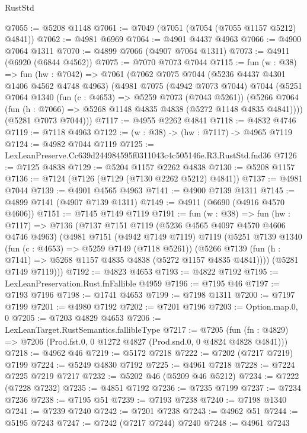 \begin{lexlean}{RustStd}
\begin{coremodule}
@7055 := @5208 @1148
@7061 := @7049 (@7051 (@7054 (@7055 @1157 @5212) @4841))
@7062 := @4981 @6969
@7064 := @4901 @4437 @4963
@7066 := @4900 @7064 @1311
@7070 := @4899 @7066 (@4907 @7064 @1311)
@7073 := @4911 (@6920 (@6844 @4562))
@7075 := @7070 @7073 @7044
@7115 := fun (w : @38) =>
  fun (hw : @7042) =>
  @7061
    (@7062
      @7075
      @7044
      (@5236 @4437 @4301 @1406 @4562 @4748 @4963)
      (@4981
        @7075
        (@4942 @7073 @7044)
        @7044
        (@5251
          @7064
          @1340
          (fun (c : @4653) => @5259 @7073 (@7043 @5261))
          (@5266 @7064 (fun (h : @7066) => @5268 @1148 @4835 @4838 (@5272 @1148 @4835 @4841))))
        (@5281 @7073 @7044)))
@7117 := @4955 @2262 @4841
@7118 := @4832 @4746
@7119 := @7118 @4963
@7122 := (w : @38) -> (hw : @7117) -> @4965 @7119
@7124 := @4982 @7044 @7119
@7125 := LexLeanPreserve.Cc639d244984595f0311043c4c505146e.R3.RustStd.fnd36
@7126 := @7125 @4838
@7129 := @5204 @1157 @2262 @4838
@7130 := @5208 @1157
@7136 := @7124 (@7126 (@7129 (@7130 @2262 @5212) @4841))
@7137 := @4981 @7044
@7139 := @4901 @4565 @4963
@7141 := @4900 @7139 @1311
@7145 := @4899 @7141 (@4907 @7139 @1311)
@7149 := @4911 (@6690 (@4916 @4570 @4606))
@7151 := @7145 @7149 @7119
@7191 := fun (w : @38) =>
  fun (hw : @7117) =>
  @7136
    (@7137
      @7151
      @7119
      (@5236 @4565 @4097 @4570 @4606 @4746 @4963)
      (@4981
        @7151
        (@4942 @7149 @7119)
        @7119
        (@5251
          @7139
          @1340
          (fun (c : @4653) => @5259 @7149 (@7118 @5261))
          (@5266 @7139 (fun (h : @7141) => @5268 @1157 @4835 @4838 (@5272 @1157 @4835 @4841))))
        (@5281 @7149 @7119)))
@7192 := @4823 @4653
@7193 := @4822 @7192
@7195 := LexLeanPreservation.Rust.fnFallible @4959
@7196 := @7195 @46
@7197 := @7193 @7196
@7198 := @1741 @4653
@7199 := @7198 @1311
@7200 := @7197 @7199
@7201 := @4980 @7192
@7202 := @7201 @7196
@7203 := Option.map.{0, 0}
@7205 := @7203 @4829 @4653
@7206 := LexLeanTarget.RustSemantics.fallibleType
@7217 := @7205
    (fun (fn : @4829) => @7206 (Prod.fst.{0, 0} @1272 @4827 (Prod.snd.{0, 0} @4824 @4828 @4841)))
@7218 := @4962 @46
@7219 := @5172 @7218
@7222 := @7202 (@7217 @7219) @7199
@7224 := @5249 @4830 @7192
@7225 := @4961 @7218
@7228 := @7224 @7225 @7219 @7217
@7232 := @5202 @46 (@5209 @46 @5212)
@7234 := @7222 (@7228 @7232)
@7235 := @4851 @7192
@7236 := @7235 @7199
@7237 := @7234 @7236
@7238 := @7195 @51
@7239 := @7193 @7238
@7240 := @7198 @1340
@7241 := @7239 @7240
@7242 := @7201 @7238
@7243 := @4962 @51
@7244 := @5195 @7243
@7247 := @7242 (@7217 @7244) @7240
@7248 := @4961 @7243

\end{coremodule}
\end{lexlean}
